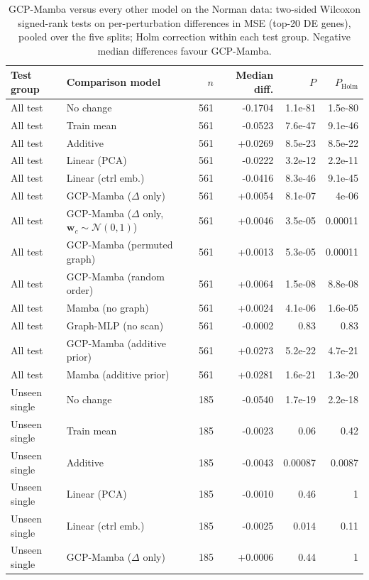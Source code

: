 \begin{longtable}{llrrrr}
\caption{GCP-Mamba versus every other model on the Norman data: two-sided Wilcoxon signed-rank tests on per-perturbation differences in MSE (top-20 DE genes), pooled over the five splits; Holm correction within each test group. Negative median differences favour GCP-Mamba.}\label{tab:tests}\\
\toprule
Test group & Comparison model & $n$ & Median diff. & $P$ & $P_{\mathrm{Holm}}$ \\
\midrule
\endhead
All test & No change & 561 & -0.1704 & 1.1e-81 & 1.5e-80 \\
All test & Train mean & 561 & -0.0523 & 7.6e-47 & 9.1e-46 \\
All test & Additive & 561 & +0.0269 & 8.5e-23 & 8.5e-22 \\
All test & Linear (PCA) & 561 & -0.0222 & 3.2e-12 & 2.2e-11 \\
All test & Linear (ctrl emb.) & 561 & -0.0416 & 8.3e-46 & 9.1e-45 \\
All test & GCP-Mamba ($\Delta$ only) & 561 & +0.0054 & 8.1e-07 & 4e-06 \\
All test & GCP-Mamba ($\Delta$ only, $\mathbf{w}_c\sim\mathcal{N}(0,1)$) & 561 & +0.0046 & 3.5e-05 & 0.00011 \\
All test & GCP-Mamba (permuted graph) & 561 & +0.0013 & 5.3e-05 & 0.00011 \\
All test & GCP-Mamba (random order) & 561 & +0.0064 & 1.5e-08 & 8.8e-08 \\
All test & Mamba (no graph) & 561 & +0.0024 & 4.1e-06 & 1.6e-05 \\
All test & Graph-MLP (no scan) & 561 & -0.0002 & 0.83 & 0.83 \\
All test & GCP-Mamba (additive prior) & 561 & +0.0273 & 5.2e-22 & 4.7e-21 \\
All test & Mamba (additive prior) & 561 & +0.0281 & 1.6e-21 & 1.3e-20 \\
\midrule
Unseen single & No change & 185 & -0.0540 & 1.7e-19 & 2.2e-18 \\
Unseen single & Train mean & 185 & -0.0023 & 0.06 & 0.42 \\
Unseen single & Additive & 185 & -0.0043 & 0.00087 & 0.0087 \\
Unseen single & Linear (PCA) & 185 & -0.0010 & 0.46 & 1 \\
Unseen single & Linear (ctrl emb.) & 185 & -0.0025 & 0.014 & 0.11 \\
Unseen single & GCP-Mamba ($\Delta$ only) & 185 & +0.0006 & 0.44 & 1 \\

\end{longtable}
